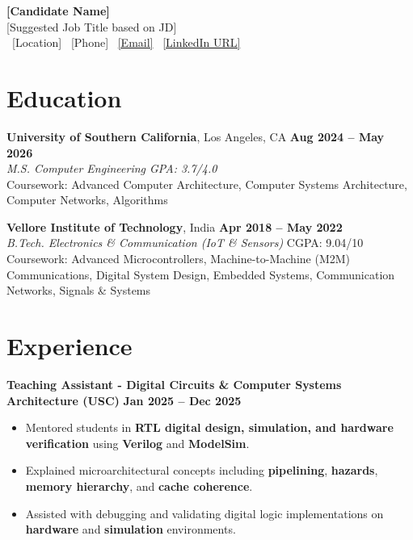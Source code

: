 \documentclass[letterpaper,11pt]{article}
\begin{document}
\begin{center}
    {\LARGE \textbf{[Candidate Name]}}\\
   {\normalsize [Suggested Job Title based on JD]}\\
\small
    \faMapMarker*\ [Location]
    \quad
    \faPhone*\ [Phone]
    \quad
    \faEnvelope\ \href{mailto:[Email]}{[Email]}
    \quad
    \faLinkedin\ \href{[LinkedIn URL]}{[LinkedIn URL]}
\end{center}
\vspace{-13pt}

\section*{Education}

\textbf{University of Southern California}, Los Angeles, CA \hfill \textbf{Aug 2024 -- May 2026} \\
\textit{M.S. Computer Engineering \hfill GPA: 3.7/4.0 }\\
Coursework: Advanced Computer Architecture, Computer Systems Architecture, Computer Networks, Algorithms

\vspace{4pt}

\textbf{Vellore Institute of Technology}, India \hfill \textbf{Apr 2018 -- May 2022} \\
\textit{B.Tech. Electronics \& Communication (IoT \& Sensors) }\hfill CGPA: 9.04/10 \\
Coursework: Advanced Microcontrollers, Machine-to-Machine (M2M) Communications, Digital System Design, Embedded Systems, Communication Networks, Signals \& Systems

\section*{Experience}

\textbf{Teaching Assistant - Digital Circuits \& Computer Systems Architecture (USC)} \hfill \textbf{Jan 2025 -- Dec 2025} \\
\begin{itemize}
\item Mentored students in \textbf{RTL digital design, simulation, and hardware verification} using \textbf{Verilog} and \textbf{ModelSim}.
\item Explained microarchitectural concepts including \textbf{pipelining}, \textbf{hazards}, \textbf{memory hierarchy}, and \textbf{cache coherence}.
\item Assisted with debugging and validating digital logic implementations on \textbf{hardware} and \textbf{simulation} environments.
\end{itemize}
\end{document}
